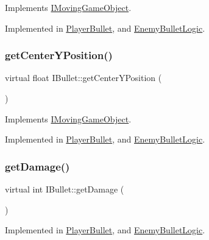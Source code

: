Implements \hyperlink{class_i_moving_game_object_ae4e6c21094ef1e2db32729270c8a7999}{I\+Moving\+Game\+Object}.



Implemented in \hyperlink{class_player_bullet_a73c27dca47ea3fdcecd82ce4b2089c4a}{Player\+Bullet}, and \hyperlink{class_enemy_bullet_logic_a39ffa8b7fabb84625a859691099652de}{Enemy\+Bullet\+Logic}.

\mbox{\label{class_i_bullet_a8245ed2bc72beed1d69547ce5f87a021}} 
\subsubsection{\texorpdfstring{get\+Center\+Y\+Position()}{getCenterYPosition()}}
{\footnotesize\ttfamily virtual float I\+Bullet\+::get\+Center\+Y\+Position (\begin{DoxyParamCaption}{ }\end{DoxyParamCaption})\hspace{0.3cm}{\ttfamily [pure virtual]}}



Implements \hyperlink{class_i_moving_game_object_a075f69d69fd38dc02a0ec3c7b1cb0534}{I\+Moving\+Game\+Object}.



Implemented in \hyperlink{class_player_bullet_a7ad2bc922595b9a11373fd42666926ef}{Player\+Bullet}, and \hyperlink{class_enemy_bullet_logic_a4c006085f2a11f68e8043bca67d3effe}{Enemy\+Bullet\+Logic}.

\mbox{\label{class_i_bullet_ab6643a4ad3888ee4ebfbc3d445c4b73d}} 
\subsubsection{\texorpdfstring{get\+Damage()}{getDamage()}}
{\footnotesize\ttfamily virtual int I\+Bullet\+::get\+Damage (\begin{DoxyParamCaption}{ }\end{DoxyParamCaption})\hspace{0.3cm}{\ttfamily [pure virtual]}}



Implemented in \hyperlink{class_player_bullet_a55375b5c3f4f87d00daba1cda12b1e79}{Player\+Bullet}, and \hyperlink{class_enemy_bullet_logic_a08dd084364fc7efc689a7f98e1cee688}{Enemy\+Bullet\+Logic}.

